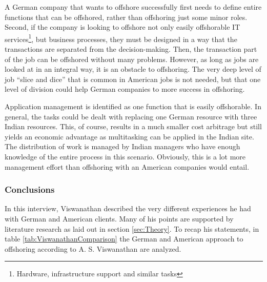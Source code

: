 A German company that wants to offshore successfully first needs to define entire functions that can be offshored, rather than offshoring just some minor roles. Second, if the company is looking to offshore not only easily offshorable IT services\footnote{Hardware, infrastructure support and similar tasks}, but business processes, they must be designed in a way that the transactions are separated from the decision-making. Then, the transaction part of the job can be offshored without many problems. However, as long as jobs are looked at in an integral way, it is an obstacle to offshoring. The very deep level of job ``slice and dice'' that is common in American jobs is not needed, but that one level of division could help German companies to more success in offshoring.

Application management is identified as one function that is easily offshorable. In general, the tasks could be dealt with replacing one German resource with three Indian resources. This, of course, results in a much smaller cost arbitrage but still yields an economic advantage as multitasking can be applied in the Indian site. The distribution of work is managed by Indian managers who have enough knowledge of the entire process in this scenario. Obviously, this is a lot more management effort than offshoring with an American companies would entail.

\subsubsection{Conclusions}
In this interview, Viswanathan described the very different experiences he had with German and American clients. Many of his points are supported by literature research as laid out in section \ref{sec:Theory}. To recap his statements, in table \ref{tab:ViswanathanComparison} the German and American approach to offshoring according to A. S. Viswanathan are analyzed.

